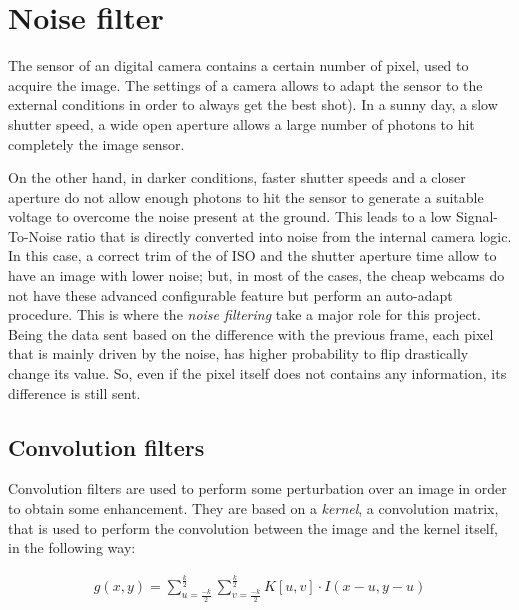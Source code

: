 \documentclass[paper=a4, fontsize=10pt]{scrartcl}	%
\begin{document}
	\section{Noise filter}
	The sensor of an digital camera contains a certain number of pixel, used to acquire the image. The settings of a camera allows to adapt the sensor to the external conditions in order to always get the best shot). In a sunny day, a slow  shutter speed, a wide open aperture allows a large number of photons to hit completely the image sensor.
	
	On the other hand, in darker conditions, faster shutter speeds and a closer aperture do not allow enough photons to hit the sensor to generate a suitable voltage to overcome the noise present at the ground. This leads to a low Signal-To-Noise ratio that is directly converted into noise from the internal camera logic. In this case, a correct trim of the of ISO and the shutter aperture time allow to have an image with lower noise; but, in most of the cases, the cheap webcams do not have these advanced configurable feature but perform an auto-adapt procedure.\newline\newline
	This is where the \textit{noise filtering} take a major role for this project. Being the data sent based on the difference with the previous frame, each pixel that is mainly driven by the noise, has higher probability to flip drastically change its value. So, even if the pixel itself does not contains any information, its difference is still sent.
	
	\subsection{Convolution filters}
	Convolution filters are used to perform some perturbation over an image in order to obtain some enhancement. They are based on a \textit{kernel}, a convolution matrix, that is used to perform the convolution between the image and the kernel itself, in the following way:
	
	\begin{align*}
		g(x,y) = \sum_{u = \frac{-k}{2}}^{\frac{k}{2}} \sum_{v = \frac{-k}{2}}^{\frac{k}{2}} K[u,v] \cdot I(x-u, y-u)
	\end{align*}
	
\end{document}
